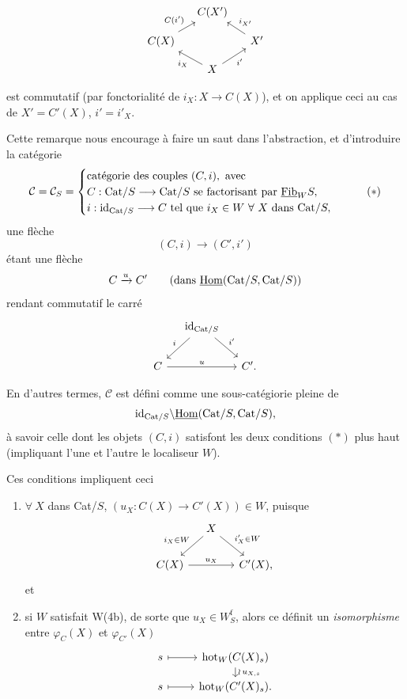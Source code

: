 \[
\begin{tikzcd}[column sep=small, row sep=small]
 & C(X') & \\
C(X) \arrow[ur, "C(i')"] & & X' \arrow[ul, "i_{X'}"'] \\
 & X \arrow[ul, "i_X"] \arrow[ur, "i'"'] &
\end{tikzcd}
\]

est commutatif (par fonctorialité de $i_X : X \longrightarrow C(X)$), et on applique ceci au cas de $X' = C'(X)$, $i' = i'_X$.

Cette remarque nous encourage à faire un saut dans l'abstraction, et d'introduire la catégorie
\[
\mathcal{C} = \mathcal{C}_S = \begin{cases}
\text{catégorie des couples } (C,i), \text{ avec} \\
C : \Cat/S \longrightarrow \Cat/S \text{ se factorisant par } \Fib_W S, \\
i : \id_{\Cat/S} \longrightarrow C \text{ tel que } i_X \in W \ \forall\ X \text{ dans } \Cat/S,
\end{cases}
\tag*{$(*)$}
\]
une flèche
\[
(C,i) \longrightarrow (C',i')
\]
étant une flèche
\[
C \xrightarrow{u} C' \qquad \text{(dans } \underline{\mathrm{Hom}}(\mathrm{Cat}/S, \mathrm{Cat}/S))
\]
rendant commutatif le carré
\[
\begin{tikzcd}[column sep=small]
 & \id_{\Cat/S} \arrow[dl, "i"'] \arrow[dr, "i'"] & \\
C \arrow[rr, "u"] & & C'.
\end{tikzcd}
\]

En d'autres termes, $\mathcal{C}$ est défini comme une sous-catégiorie pleine de %
\[
\mathrm{id}_{\mathrm{Cat}/S}\backslash\underline{\mathrm{Hom}}(\mathrm{Cat}/S, \mathrm{Cat}/S),
\]
à savoir celle dont les objets $(C,i)$ satisfont les deux conditions $(*)$ plus haut (impliquant l'une et l'autre le localiseur $W$).

Ces conditions impliquent ceci

\begin{enumerate}
\item[a)] $\forall\ X$ dans Cat/$S$, $(u_X : C(X) \longrightarrow C'(X)) \in W$, puisque
\[
\begin{tikzcd}[column sep=small]
 & X \arrow[dl, "i_X\in W"'] \arrow[dr, "i'_X\in W"] & \\
C(X) \arrow[rr, "u_X"] & & C'(X),
\end{tikzcd}
\]
et

\item[b)] si $W$ satisfait W(4b), de sorte que $u_X \in W^{\mathrm{f}}_S$, alors ce définit un \textit{isomorphisme} entre $\varphi_C(X)$ et $\varphi_{C'}(X)$ %
\[
\begin{tikzcd}[row sep=small]
s \arrow[r, mapsto] & \hot_W(C(X)_s) \arrow[d, "\wr\, u_{X,s}"] \\
s \arrow[r, mapsto] & \hot_W(C'(X)_s).
\end{tikzcd}
\]
\end{enumerate}

